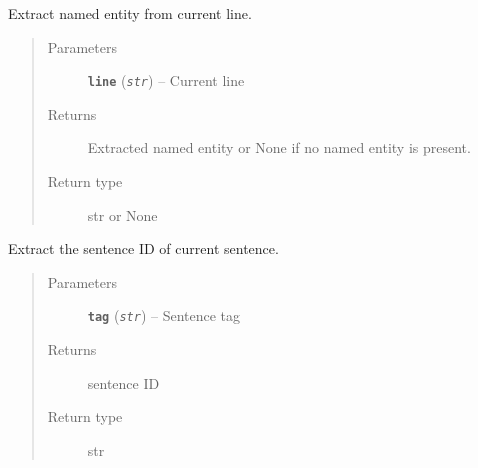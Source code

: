 \documentclass[letterpaper,10pt,english]{sphinxmanual}
\begin{document}
\begin{fulllineitems}
\label{src.prep.corpus:src.prep.corpus.convert_to_plain.extract_named_entity}
Extract named entity from current line.
\begin{quote}\begin{description}
\item[{Parameters}] \leavevmode
\textbf{\texttt{line}} (\emph{\texttt{str}}) -- Current line

\item[{Returns}] \leavevmode
Extracted named entity or None if no named entity is present.

\item[{Return type}] \leavevmode
str or None

\end{description}\end{quote}

\end{fulllineitems}


\begin{fulllineitems}
\label{src.prep.corpus:src.prep.corpus.convert_to_plain.extract_sentence_id}
Extract the sentence ID of current sentence.
\begin{quote}\begin{description}
\item[{Parameters}] \leavevmode
\textbf{\texttt{tag}} (\emph{\texttt{str}}) -- Sentence tag

\item[{Returns}] \leavevmode
sentence ID

\item[{Return type}] \leavevmode
str

\end{description}\end{quote}

\end{fulllineitems}

\end{document}
